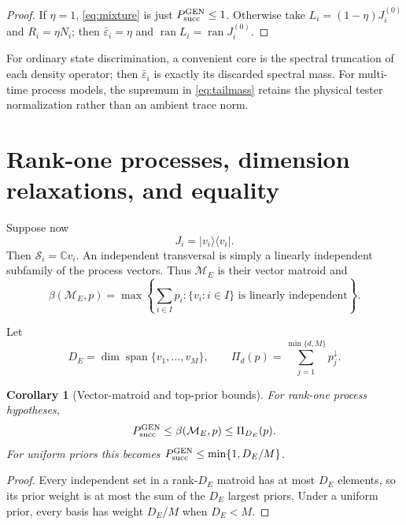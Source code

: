 \documentclass[11pt]{article}
\newtheorem{corollary}[theorem]{Corollary}
\theoremstyle{definition}
\theoremstyle{remark}
\newcommand{\C}{\mathbb C}
\newcommand{\Span}{\operatorname{span}}
\newcommand{\ran}{\operatorname{ran}}
\newcommand{\cM}{\mathcal M}
\newcommand{\cS}{\mathcal S}
\newcommand{\ket}[1]{\lvert #1\rangle}
\newcommand{\bra}[1]{\langle #1\rvert}
\begin{document}
\begin{proof}
If $\eta=1$, \cref{eq:mixture} is just $P_{\rm succ}^{\rm GEN}\leq1$.
Otherwise take $L_i=(1-\eta)J_i^{(0)}$ and $R_i=\eta N_i$; then
$\bar\varepsilon_i=\eta$ and $\ran L_i=\ran J_i^{(0)}$.
\end{proof}

For ordinary state discrimination, a convenient core is the spectral
truncation of each density operator; then $\bar\varepsilon_i$ is exactly its
discarded spectral mass.  For multi-time process models, the supremum in
\cref{eq:tailmass} retains the physical tester normalization rather than an
ambient trace norm.

\section{Rank-one processes, dimension relaxations, and equality}

Suppose now
\begin{equation}
                         J_i=\ket{v_i}\!\bra{v_i}.       \label{eq:pureJ}
\end{equation}
Then $\cS_i=\C v_i$.  An independent transversal is simply a linearly
independent subfamily of the process vectors.  Thus $\cM_E$ is their vector
matroid and
\begin{equation}
 \beta(\cM_E,p)=
 \max\left\{\sum_{i\in I}p_i:\{v_i:i\in I\}
                         \text{ is linearly independent}\right\}.       \label{eq:vectorbeta}
\end{equation}

Let
\begin{equation}
            D_E=\dim\Span\{v_1,\ldots,v_M\},
 \qquad
 \Pi_d(p)=\sum_{j=1}^{\min\{d,M\}}p_j^\downarrow.      \label{eq:Pi}
\end{equation}

\begin{corollary}[Vector-matroid and top-prior bounds]\label{cor:pure}
For rank-one process hypotheses,
\begin{equation}
 P_{\rm succ}^{\rm GEN}
 \leq\beta(\cM_E,p)
 \leq\Pi_{D_E}(p).                                     \label{eq:purebounds}
\end{equation}
For uniform priors this becomes
$P_{\rm succ}^{\rm GEN}\leq\min\{1,D_E/M\}$.
\end{corollary}

\begin{proof}
Every independent set in a rank-$D_E$ matroid has at most $D_E$ elements, so
its prior weight is at most the sum of the $D_E$ largest priors.  Under a
uniform prior, every basis has weight $D_E/M$ when $D_E<M$.
\end{proof}
\end{document}

